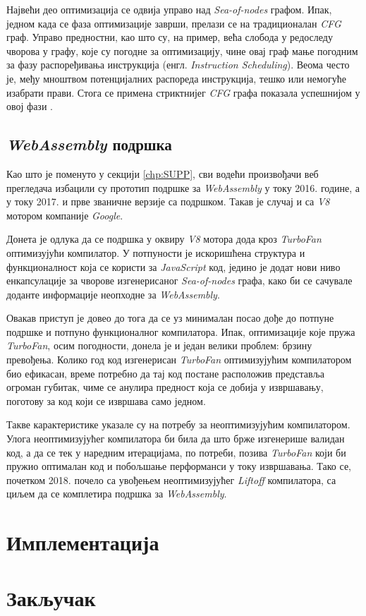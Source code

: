 \documentclass[12pt,oneside]{memoir}
\begin{document}
Највећи део оптимизација се одвија управо над \textit{Sea-of-nodes} графом. Ипак, једном када се фаза оптимизације заврши, прелази се на традиционалан \textit{CFG} граф.
Управо предностни, као што су, на пример, већа слобода у редоследу чворова у графу, које су погодне за оптимизацију, чине овај граф мање погодним за фазу распоређивања
инструкција (енгл. \textit{Instruction Scheduling}). Веома често је, међу мноштвом потенцијалних распореда инструкција, тешко или немогуће изабрати прави. Стога се примена стриктнијег \textit{CFG}
графа показала успешнијом у овој фази \cite{TFJIT}.

\section{\textit{WebAssembly} подршка} \label{chp:V8WASM}

Као што је поменуто у секцији \ref{chp:SUPP}, сви водећи произвођачи веб прегледача избацили су прототип подршке за \textit{WebAssembly} у току 2016. године, а у току 2017.
и прве званичне верзије са подршком. Такав је случај и са \textit{V8} мотором компаније \textit{Google}.

Донета је одлука да се подршка у оквиру \textit{V8} мотора дода кроз \textit{TurboFan} оптимизујући компилатор. У потпуности је искоришћена структура и функционалност која се користи
за \textit{JavaScript} код, једино је додат нови ниво енкапсулације за чворове изгенерисаног \textit{Sea-of-nodes} графа, како би се сачувале доданте информације неопходне за
\textit{WebAssembly}.

Овакав приступ је довео до тога да се уз минималан посао дође до потпуне подршке и потпуно функционалног компилатора. Ипак, оптимизације које пружа \textit{TurboFan}, осим погодности,
донела је и један велики проблем: брзину превођења. Колико год код изгенерисан \textit{TurboFan} оптимизујућим компилатором био ефикасан, време потребно да тај код
постане расположив представља огроман губитак, чиме се анулира предност која се добија у извршавању, поготову за код који се извршава само једном.


Такве карактеристике указале су на потребу за неоптимизујућим компилатором. Улога неоптимизујућег компилатора би била да што брже изгенерише валидан код,
а да се тек у наредним итерацијама, по потреби, позива \textit{TurboFan} који би пружио оптималан код и побољшање перформанси у току извршавања.
Тако се, почетком 2018. почело са увођењем неоптимизујућег \textit{Liftoff} компилатора, са циљем да се комплетира подршка за \textit{WebAssembly}.

\chapter{Имплементација}

\chapter{Закључак}

\literatura

\backmatter
\end{document}
